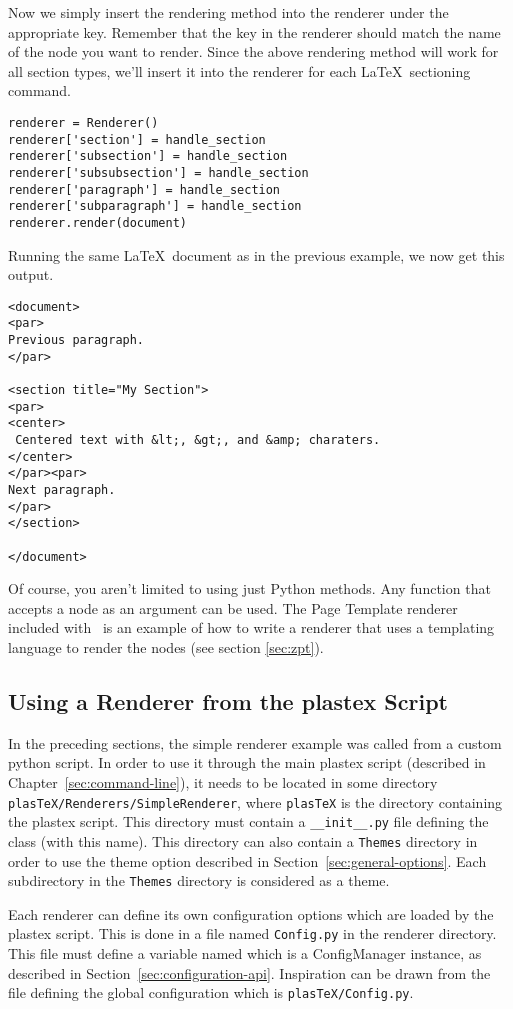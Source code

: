 Now we simply insert the rendering method into the renderer under the
appropriate key.  Remember that the key in the renderer should match
the name of the node you want to render.  Since the above rendering 
method will work for all section types, we'll insert it into the 
renderer for each \LaTeX\ sectioning command.
\begin{verbatim}
renderer = Renderer()
renderer['section'] = handle_section
renderer['subsection'] = handle_section
renderer['subsubsection'] = handle_section
renderer['paragraph'] = handle_section
renderer['subparagraph'] = handle_section
renderer.render(document)
\end{verbatim}

Running the same \LaTeX\ document as in the previous example, we now get
this output.
\begin{verbatim}
<document>
<par>
Previous paragraph.
</par>

<section title="My Section">
<par>
<center>
 Centered text with &lt;, &gt;, and &amp; charaters.
</center>
</par><par>
Next paragraph.
</par>
</section>

</document>
\end{verbatim}

Of course, you aren't limited to using just Python methods.  Any function
that accepts a node as an argument can be used.  The 
Page Template renderer included with \plasTeX\ is an example 
of how to write a renderer that uses a templating language to render
the nodes (see section \ref{sec:zpt}).

\subsection{Using a Renderer from the plastex Script}
\label{subsec:renderer-from-script}

In the preceding sections, the simple renderer example was called from
a custom python script. In order to use it through the
main plastex script (described in Chapter~\ref{sec:command-line}), it
needs to be located in some directory
\verb+plasTeX/Renderers/SimpleRenderer+, where \verb+plasTeX+ is the
directory containing the plastex script. This directory must contain a
\verb+__init__.py+ file defining the  class (with this
name). This directory can also contain a \verb+Themes+ directory in
order to use the theme option described in
Section~\ref{sec:general-options}. Each subdirectory in the
\verb+Themes+ directory is considered as a theme.

Each renderer can define its own configuration options which are loaded
by the plastex script. This is done in a file named \verb+Config.py+
in the renderer directory. This file must define a variable named
 which is a ConfigManager instance, as described in
Section~\ref{sec:configuration-api}. Inspiration can be drawn from the
file defining the global configuration which is
\verb+plasTeX/Config.py+.


